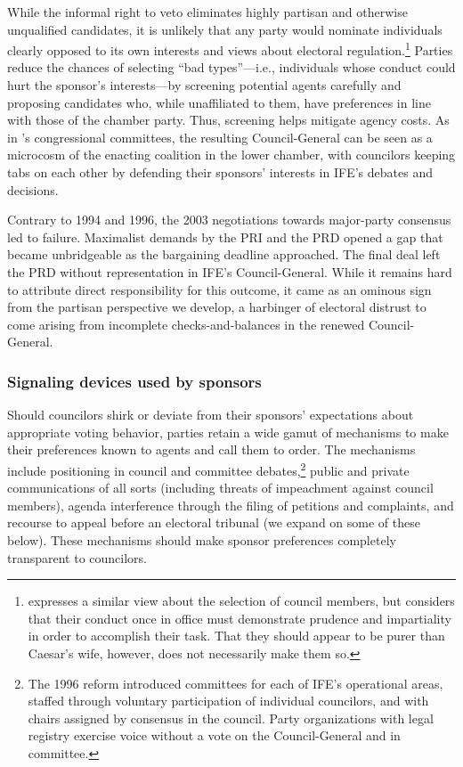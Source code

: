 \documentclass[12 pt, letter]{article}
\begin{document}
While the informal right to veto eliminates highly partisan and
otherwise unqualified candidates, it is unlikely that any party
would nominate individuals clearly opposed to its own interests and
views about electoral regulation.\footnote{\citet{Schedler2000a}
expresses a similar view about the selection of council members, but
considers that their conduct once in office must demonstrate
prudence and impartiality in order to accomplish their task.  That
they should appear to be purer than Caesar's wife, however, does not
necessarily make them so.} Parties reduce the chances of selecting
``bad types''---i.e., individuals whose conduct could hurt the
sponsor's interests---by screening potential agents carefully and
proposing candidates who, while unaffiliated to them, have
preferences in line with those of the chamber party.  Thus,
screening helps mitigate agency costs.  As in
\citeauthor*{Cox1993}'s \citeyearpar{Cox1993} congressional
committees, the resulting Council-General can be seen as a microcosm
of the enacting coalition in the lower chamber, with councilors
keeping tabs on each other by defending their sponsors' interests in
IFE's debates and decisions.

Contrary to 1994 and 1996, the 2003 negotiations towards major-party
consensus led to failure.  Maximalist demands by the PRI and the PRD
opened a gap that became unbridgeable as the bargaining deadline
approached. The final deal left the PRD without representation in
IFE's Council-General. While it remains hard to attribute direct
responsibility for this outcome, it came as an ominous sign from the
partisan perspective we develop, a harbinger of electoral distrust
to come arising from incomplete checks-and-balances in the renewed
Council-General.



\subsubsection{Signaling devices used by sponsors}
Should councilors shirk or deviate from their sponsors' expectations
about appropriate voting behavior, parties retain a wide gamut of
mechanisms to make their preferences known to agents and call them
to order.  The mechanisms include positioning in council and
committee debates,\footnote{The 1996 reform introduced committees
for each of IFE's operational areas, staffed through voluntary
participation of individual councilors, and with chairs assigned by
consensus in the council. Party organizations with legal registry
exercise voice without a vote on the Council-General and in
committee.} public and private communications of all sorts
(including threats of impeachment against council members), agenda
interference through the filing of petitions and complaints, and
recourse to appeal before an electoral tribunal (we expand on some
of these below).  These mechanisms should make sponsor preferences
completely transparent to councilors.
\end{document}
